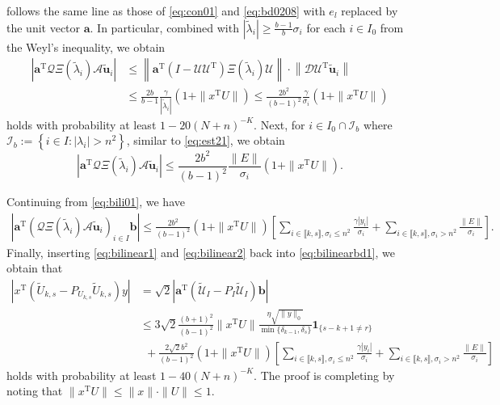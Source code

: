 \documentclass[reqno]{amsart}
\newcommand{\T}{\mathrm{T}}
\theoremstyle{plain}
\theoremstyle{definition}
\begin{document}
\endgroup
follows the same line as those of \eqref{eq:con01} and \eqref{eq:bd0208} with $e_l$ replaced by the unit vector $\mathbf a$. 
In particular, combined with $|\widetilde{\lambda}_i| \ge \frac{b-1}{b} \sigma_i$ for each $i\in I_0$ from the Weyl's inequality, we obtain
\begin{align*}
\left|\mathbf a^\T \mathcal Q \Xi(\widetilde \lambda_i) \mathcal A \widetilde{\mathbf u}_i \right| &\le  \left\| \mathbf a^\T (I-\mathcal U \mathcal U^\T) \Xi(\widetilde \lambda_i) \mathcal U \right\| \cdot \left\| \mathcal D \mathcal U^\T \widetilde{\mathbf u}_i \right\|\\
& \le \frac{2b}{b-1} \frac{\gamma }{|\widetilde \lambda_i|}(1+ \|x^\T U \|)\le \frac{2b^2}{(b-1)^2} \frac{\gamma }{\sigma_i}(1+ \|x^\T U \|)
\end{align*}
holds with probability at least $1-20(N+n)^{-K}$.  Next, for $i\in I_0 \cap \mathcal I_b$ where $\mathcal I_b := \left\{ i \in I: | \lambda_i| > n^2 \right\}$, similar to \eqref{eq:est21}, we obtain
\[ \left|\mathbf a^\T \mathcal Q \Xi(\widetilde \lambda_i) \mathcal A \widetilde{\mathbf u}_i \right| \le \frac{2b^2}{(b-1)^2} \frac{\|E\|}{\sigma_i} (1+\|x^\T U\|).\] 

Continuing from \eqref{eq:bili01}, we have
\begin{align}\label{eq:bilinear2} 
 \left| \mathbf a^\T (\mathcal Q \Xi(\widetilde \lambda_i) \mathcal A \widetilde{\mathbf u}_i)_{i\in I} \mathbf b \right| \le \frac{2b^2}{(b-1)^2}  (1+ \|x^\T U \|)  \left[  \sum_{i\in \llbracket k, s\rrbracket, \sigma_i\le n^2} \frac{{\gamma } |y_i|}{\sigma_i} + \sum_{i\in \llbracket k, s\rrbracket, \sigma_i> n^2} \frac{\|E\|}{\sigma_i} \right].
\end{align}
Finally, inserting \eqref{eq:bilinear1} and \eqref{eq:bilinear2} back into \eqref{eq:bilinearbd1}, we obtain that
\begin{align*}
\left| x^\T (\widetilde U_{k,s}-P_{U_{k,s}}\widetilde U_{k,s}) y \right| &=\sqrt{2} \left|\mathbf a^\T (\widetilde{\mathcal U}_I - P_I \widetilde{\mathcal U}_I)\mathbf b \right|\\
&\le 3\sqrt{2} \frac{(b+1)^2}{(b-1)^2}  \| x^\T U\| \frac{\eta \sqrt{\|y\|_0}}{\min\{\delta_{k-1}, \delta_s\}}\mathbf{1}_{\{s-k+1\neq r\}}\\
&\  \ + \frac{2\sqrt{2}b^2}{(b-1)^2}(1+ \|x^\T U \|) \left[  \sum_{i\in \llbracket k, s\rrbracket, \sigma_i\le n^2} \frac{{\gamma } |y_i|}{\sigma_i} +  \sum_{i\in \llbracket k, s\rrbracket, \sigma_i> n^2} \frac{\|E\|}{\sigma_i} \right]
\end{align*}
holds with probability at least $1-40(N+n)^{-K}$. The proof is completing by noting that $ \| x^\T U\| \le \|x\| \cdot \|U\| \le 1$.
\end{document}
